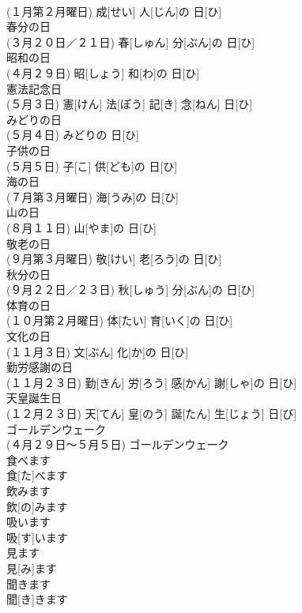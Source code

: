 \documentclass[8pt]{extreport}
\begin{document}
\begin{CJK}{UTF8}{min}
\\	(１月第２月曜日)	成[せい] 人[じん]の 日[ひ]		
\\	春分の日	
\\	(３月２０日／２１日)	春[しゅん] 分[ぶん]の 日[ひ]		
\\	昭和の日	
\\	(４月２９日)	昭[しょう] 和[わ]の 日[ひ]		
\\	憲法記念日	
\\	(５月３日)	憲[けん] 法[ぽう] 記[き] 念[ねん] 日[ひ]		
\\	みどりの日	
\\	(５月４日)	みどりの 日[ひ]		
\\	子供の日	
\\	(５月５日)	子[こ] 供[ども]の 日[ひ]		
\\	海の日	
\\	(７月第３月曜日)	海[うみ]の 日[ひ]		
\\	山の日	
\\	(８月１１日)	山[やま]の 日[ひ]		
\\	敬老の日	
\\	(９月第３月曜日)	敬[けい] 老[ろう]の 日[ひ]		
\\	秋分の日	
\\	(９月２２日／２３日)	秋[しゅう] 分[ぶん]の 日[ひ]		
\\	体育の日	
\\	(１０月第２月曜日)	体[たい] 育[いく]の 日[ひ]		
\\	文化の日	
\\	(１１月３日)	文[ぶん] 化[か]の 日[ひ]		
\\	勤労感謝の日	
\\	(１１月２３日)	勤[きん] 労[ろう] 感[かん] 謝[しゃ]の 日[ひ]		
\\	天皇誕生日	
\\	(１２月２３日)	天[てん] 皇[のう] 誕[たん] 生[じょう] 日[び]		
\\	ゴールデンウェーク	
\\	(４月２９日～５月５日)	ゴールデンウェーク		
\\	食べます	
\\	食[た]べます		
\\	飲みます	
\\	飲[の]みます		
\\	吸います	
\\	吸[す]います		
\\	見ます	
\\	見[み]ます		
\\	聞きます	
\\	聞[き]きます		

\end{CJK}
\end{document}
